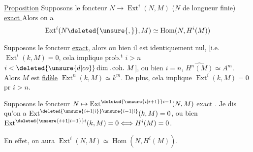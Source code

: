 \uline{Proposition} Supposons le foncteur $N\to\operatorname{Ext}^{i}(N,M)$ ($N$ de longueur finie) \uline{exact } Alors on a
\[
 \operatorname{Ext}^{i}(N\deleted{\unsure{,}},M)\simeq\operatorname{Hom}(N,H^{i}(M))
\]
\margin{[\deleted{a-t-on} \deleted{\unsure{alors $i$|alors $i=$|donc} \illegible{1}} $\operatorname{Ext}^{i}(k,M)$ ou $\operatorname{Ext}^{i-1}(k,M)=0$ ??]}

Supposons le foncteur \uline{exact}, alors ou bien il est identiquement nul, [i.e.  $\operatorname{Ext}^{i}(k,M)=0$, cela implique prob.$^{\mathrm{t}}$ $i>n$  $i<\deleted{\unsure{d|co}}\dim.\,\mathrm{coh.}\ M$], ou bien $i=n$, $\widehat{H^n(M)}\simeq A^{m}$. Alors $M$ est \uline{fidèle} $\operatorname{Ext}^{n}(k,M)\simeq k^{m}$. De plus, cela implique $\operatorname{Ext}^{i}(k,M)=0$ pr $i>n$.

\par\noindent\shortstack{\rule{.4\linewidth}{.6pt}\\[-1ex]\rule{.4\linewidth}{.3pt}}

Supposons le foncteur $N\mapsto\operatorname{Ext}^{\deleted{\unsure{i|i+1}}i-1}(N,M)$ \uline{exact} . Je dis qu'on a  $\operatorname{Ext}^{\deleted{\unsure{i+1|i}}\unsure{i-1|i}}(k,M)=0$, ou bien $\operatorname{Ext}^{\deleted{\unsure{i+1|i-1}}i}(k,M)=0\Longleftrightarrow H^{i}(M)=0$.

En effet, on aura $\operatorname{Ext}^{i}(N,M)\simeq\operatorname{Hom}(N,H^{i}(M))$.



